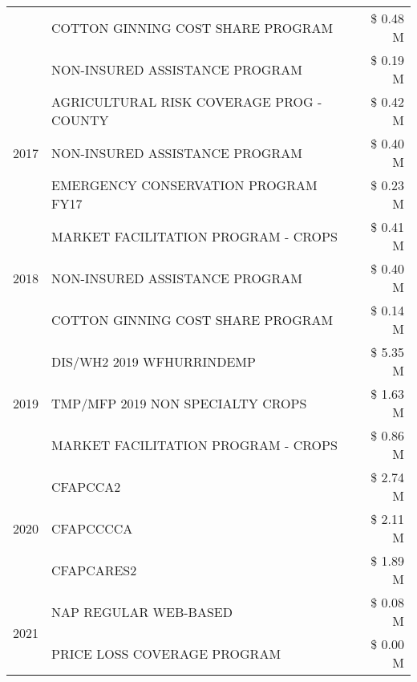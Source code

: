 \begin{tabular}{llr}
 & COTTON GINNING COST SHARE PROGRAM & \$ 0.48 M \\
 & NON-INSURED ASSISTANCE PROGRAM & \$ 0.19 M \\
\cline{1-3}
\multirow[t]{3}{*}{2017} & AGRICULTURAL RISK COVERAGE PROG - COUNTY & \$ 0.42 M \\
 & NON-INSURED ASSISTANCE PROGRAM & \$ 0.40 M \\
 & EMERGENCY CONSERVATION PROGRAM FY17 & \$ 0.23 M \\
\cline{1-3}
\multirow[t]{3}{*}{2018} & MARKET FACILITATION PROGRAM - CROPS & \$ 0.41 M \\
 & NON-INSURED ASSISTANCE PROGRAM & \$ 0.40 M \\
 & COTTON GINNING COST SHARE PROGRAM & \$ 0.14 M \\
\cline{1-3}
\multirow[t]{3}{*}{2019} & DIS/WH2 2019 WFHURRINDEMP & \$ 5.35 M \\
 & TMP/MFP 2019 NON SPECIALTY CROPS & \$ 1.63 M \\
 & MARKET FACILITATION PROGRAM - CROPS & \$ 0.86 M \\
\cline{1-3}
\multirow[t]{3}{*}{2020} & CFAPCCA2 & \$ 2.74 M \\
 & CFAPCCCCA & \$ 2.11 M \\
 & CFAPCARES2 & \$ 1.89 M \\
\cline{1-3}
\multirow[t]{2}{*}{2021} & NAP REGULAR WEB-BASED & \$ 0.08 M \\
 & PRICE LOSS COVERAGE PROGRAM & \$ 0.00 M \\
\cline{1-3}
\bottomrule
\end{tabular}
